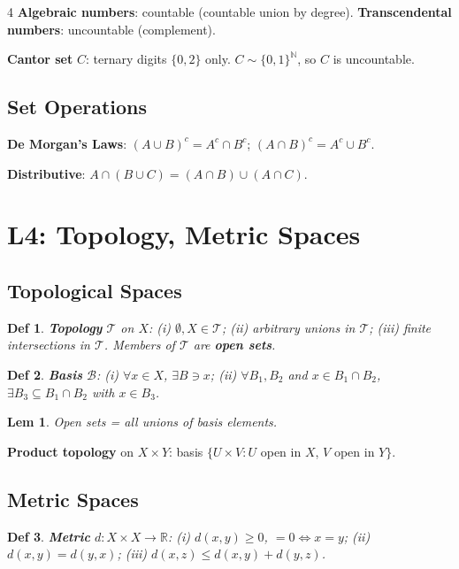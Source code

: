 \documentclass[9pt,landscape]{extarticle}
\newcommand{\R}{\mathbb{R}}
\newcommand{\N}{\mathbb{N}}
\theoremstyle{compact}
\newtheorem*{defn}{Def}
\newtheorem*{lem}{Lem}
\begin{document}
\begin{multicols}{4}
\textbf{Algebraic numbers}: countable (countable union by degree). \textbf{Transcendental numbers}: uncountable (complement).

\textbf{Cantor set} $C$: ternary digits $\{0,2\}$ only. $C \sim \{0,1\}^\N$, so $C$ is uncountable.

\subsection{Set Operations}
\textbf{De Morgan's Laws}: $(A \cup B)^c = A^c \cap B^c$;\; $(A \cap B)^c = A^c \cup B^c$.

\textbf{Distributive}: $A \cap (B \cup C) = (A \cap B) \cup (A \cap C)$.

\section{L4: Topology, Metric Spaces}

\subsection{Topological Spaces}
\begin{defn}
\textbf{Topology} $\mathcal{T}$ on $X$: (i) $\emptyset, X \in \mathcal{T}$; (ii) arbitrary unions in $\mathcal{T}$; (iii) finite intersections in $\mathcal{T}$. Members of $\mathcal{T}$ are \textbf{open sets}.
\end{defn}

\begin{defn}
\textbf{Basis} $\mathcal{B}$: (i) $\forall x \in X$, $\exists B \ni x$; (ii) $\forall B_1, B_2$ and $x \in B_1 \cap B_2$, $\exists B_3 \subseteq B_1 \cap B_2$ with $x \in B_3$.
\end{defn}

\begin{lem}
Open sets = all unions of basis elements.
\end{lem}

\textbf{Product topology} on $X \times Y$: basis $\{U \times V : U$ open in $X$, $V$ open in $Y\}$.

\subsection{Metric Spaces}
\begin{defn}
\textbf{Metric} $d: X \times X \to \R$: (i) $d(x,y) \geq 0$, $= 0 \Leftrightarrow x = y$; (ii) $d(x,y) = d(y,x)$; (iii) $d(x,z) \leq d(x,y) + d(y,z)$.
\end{defn}


\end{multicols}
\end{document}
